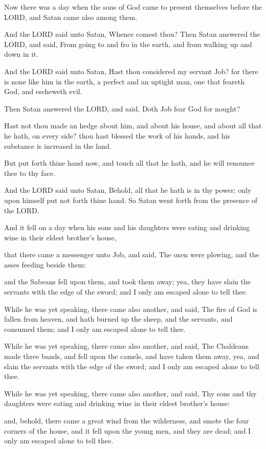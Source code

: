 \documentclass[12pt,oneside]{book}
\begin{document}
Now there was a day when the sons of God came to present themselves before the LORD, and Satan came also among them.

And the LORD said unto Satan, Whence comest thou? Then Satan answered the LORD, and said, From going to and fro in the earth, and from walking up and down in it.

And the LORD said unto Satan, Hast thou considered my servant Job? for there is none like him in the earth, a perfect and an uptight man, one that feareth God, and escheweth evil.

Then Satan answered the LORD, and said, Doth Job fear God for nought?

Hast not thou made an hedge about him, and about his house, and about all that he hath, on every side? thou hast blessed the work of his hands, and his substance is increased in the land.

But put forth thine hand now, and touch all that he hath, and he will renounce thee to thy face.

And the LORD said unto Satan, Behold, all that he hath is in thy power; only upon himself put not forth thine hand. So Satan went forth from the presence of the LORD.

And it fell on a day when his sons and his daughters were eating and drinking wine in their eldest brother's house,

that there came a messenger unto Job, and said, The oxen were plowing, and the asses feeding beside them:

and the Sabeans fell upon them, and took them away; yea, they have slain the servants with the edge of the sword; and I only am escaped alone to tell thee.

While he was yet speaking, there came also another, and said, The fire of God is fallen from heaven, and hath burned up the sheep, and the servants, and consumed them; and I only am escaped alone to tell thee.

While he was yet speaking, there came also another, and said, The Chaldeans made three bands, and fell upon the camels, and have taken them away, yea, and slain the servants with the edge of the sword; and I only am escaped alone to tell thee.

While he was yet speaking, there came also another, and said, Thy sons and thy daughters were eating and drinking wine in their eldest brother's house:

and, behold, there came a great wind from the wilderness, and smote the four corners of the house, and it fell upon the young men, and they are dead; and I only am escaped alone to tell thee.
\end{document}
